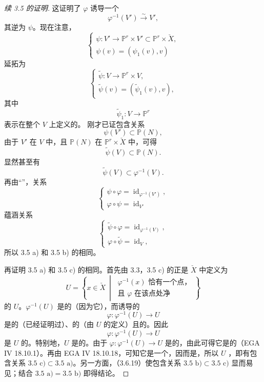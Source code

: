 \begin{proof}[续 3.5 的证明]
这证明了 $\varphi$ 诱导一个
\[
\varphi^{-1}(V')\xrightarrow{\sim}V',\tag{3.6.12}
\]
其逆为 $\psi$。现在注意，
\[
\begin{cases}
\psi:V'\longrightarrow\mathbb P^r\times V'\subset\mathbb P^r\times\check X,\\
\psi(v)=(\psi_1(v),v)
\end{cases}\tag{3.6.13}
\]
延拓为
\[
\begin{cases}
\widetilde\psi:V\longrightarrow\mathbb P^r\times V,\\
\widetilde\psi(v)=(\widetilde\psi_1(v),v),
\end{cases}\tag{3.6.14}
\]
其中
\[
\widetilde\psi_1:V\longrightarrow\mathbb P^r\tag{3.6.15}
\]
表示在整个 $V$ 上定义的。
刚才已证包含关系
\[
\psi(V')\subset\mathbb P(N),\tag{3.6.16}
\]
由于 $V'$ 在 $V$ 中，且 $\mathbb P(N)$ 在 $\mathbb P^r\times\check X$ 中，可得
\[
\widetilde\psi(V)\subset\mathbb P(N).\tag{3.6.17}
\]
显然甚至有
\[
\widetilde\psi(V)\subset\varphi^{-1}(V).\tag{3.6.18}
\]
再由“”，关系
\[
\begin{cases}
\psi\circ\varphi=\operatorname{id}_{\varphi^{-1}(V')},\\
\varphi\circ\psi=\operatorname{id}_{V'}
\end{cases}
\]
蕴涵关系
\[
\begin{cases}
\widetilde\psi\circ\varphi=\operatorname{id}_{\varphi^{-1}(V)},\\
\varphi\circ\widetilde\psi=\operatorname{id}_V,
\end{cases}
\]
所以 3.5 a) 和 3.5 b) 的相同。

再证明 3.5 a) 和 3.5 c) 的相同。首先由 3.3，3.5 c) 的正是 $\check X$ 中定义为
\[
U=\left\{x\in\check X\ \middle|\ \begin{array}{l}
\varphi^{-1}(x)\text{ 恰有一个点，}\\
\text{且 }\varphi\text{ 在该点处净}
\end{array}\right\}\tag{3.6.19}
\]
的 $U$。$\varphi^{-1}(U)$ 是的（因为它），而诱导的
\[
\varphi:\varphi^{-1}(U)\longrightarrow U
\]
是的（已经证明过）、的（由 $U$ 的定义）且的。因此
\[
\varphi:\varphi^{-1}(U)\longrightarrow U
\]
是 $U$ 的。特别地，$U$ 是的。由于 $\varphi:\varphi^{-1}(U)\to U$ 是的，由此可得它是的（EGA IV 18.10.1）。再由 EGA IV 18.10.18，可知它是一个，因而是，所以
$U$ ，即有包含关系 $3.5\text{ c)}\subset3.5\text{ a)}$。另一方面，（3.6.19）使包含关系 $3.5\text{ b)}\subset3.5\text{ c)}$ 显而易见；结合 $3.5\text{ a)}=3.5\text{ b)}$ 即得结论。
\end{proof}

